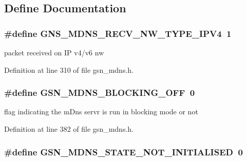 \subsection{Define Documentation}
\hypertarget{a00668_gae805e6fbb7579781605600a78cbe0959}{
\subsubsection[{GNS\_\-MDNS\_\-RECV\_\-NW\_\-TYPE\_\-IPV4}]{\setlength{\rightskip}{0pt plus 5cm}\#define GNS\_\-MDNS\_\-RECV\_\-NW\_\-TYPE\_\-IPV4~1}}
\label{a00668_gae805e6fbb7579781605600a78cbe0959}


packet received on IP v4/v6 nw 



Definition at line 310 of file gsn\_\-mdns.h.

\hypertarget{a00668_ga67c2a611f981a7e2e787c479819f28cd}{
\subsubsection[{GSN\_\-MDNS\_\-BLOCKING\_\-OFF}]{\setlength{\rightskip}{0pt plus 5cm}\#define GSN\_\-MDNS\_\-BLOCKING\_\-OFF~0}}
\label{a00668_ga67c2a611f981a7e2e787c479819f28cd}


flag indicating the mDns servr is run in blocking mode or not 



Definition at line 382 of file gsn\_\-mdns.h.

\hypertarget{a00668_ga0b9291043d21e03b1202e152d19abcb8}{
\subsubsection[{GSN\_\-MDNS\_\-STATE\_\-NOT\_\-INITIALISED}]{\setlength{\rightskip}{0pt plus 5cm}\#define GSN\_\-MDNS\_\-STATE\_\-NOT\_\-INITIALISED~0}}
\label{a00668_ga0b9291043d21e03b1202e152d19abcb8}



